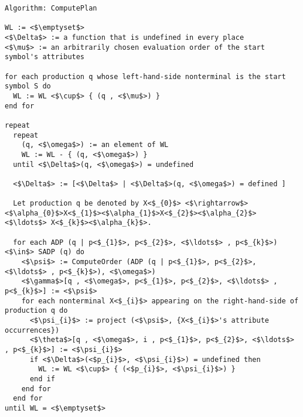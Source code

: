 \begin{lstlisting}[basicstyle=\footnotesize, escapeinside=<>, language=inform]
Algorithm: ComputePlan

WL := <$\emptyset$>
<$\Delta$> := a function that is undefined in every place
<$\mu$> := an arbitrarily chosen evaluation order of the start symbol's attributes

for each production q whose left-hand-side nonterminal is the start symbol S do
  WL := WL <$\cup$> { (q , <$\mu$>) }
end for

repeat
  repeat
    (q, <$\omega$>) := an element of WL
    WL := WL - { (q, <$\omega$>) }
  until <$\Delta$>(q, <$\omega$>) = undefined
  
  <$\Delta$> := [<$\Delta$> | <$\Delta$>(q, <$\omega$>) = defined ]
  
  Let production q be denoted by X<$_{0}$> <$\rightarrow$> <$\alpha_{0}$>X<$_{1}$><$\alpha_{1}$>X<$_{2}$><$\alpha_{2}$> <$\ldots$> X<$_{k}$><$\alpha_{k}$>.
  
  for each ADP (q | p<$_{1}$>, p<$_{2}$>, <$\ldots$> , p<$_{k}$>) <$\in$> SADP (q) do
    <$\psi$> := ComputeOrder (ADP (q | p<$_{1}$>, p<$_{2}$>, <$\ldots$> , p<$_{k}$>), <$\omega$>)
    <$\gamma$>[q , <$\omega$>, p<$_{1}$>, p<$_{2}$>, <$\ldots$> , p<$_{k}$>] := <$\psi$>
    for each nonterminal X<$_{i}$> appearing on the right-hand-side of production q do
      <$\psi_{i}$> := project (<$\psi$>, {X<$_{i}$>'s attribute occurrences})
      <$\theta$>[q , <$\omega$>, i , p<$_{1}$>, p<$_{2}$>, <$\ldots$> , p<$_{k}$>] := <$\psi_{i}$>
      if <$\Delta$>(<$p_{i}$>, <$\psi_{i}$>) = undefined then
        WL := WL <$\cup$> { (<$p_{i}$>, <$\psi_{i}$>) }
      end if
    end for
  end for
until WL = <$\emptyset$>
\end{lstlisting}

\normalsize
